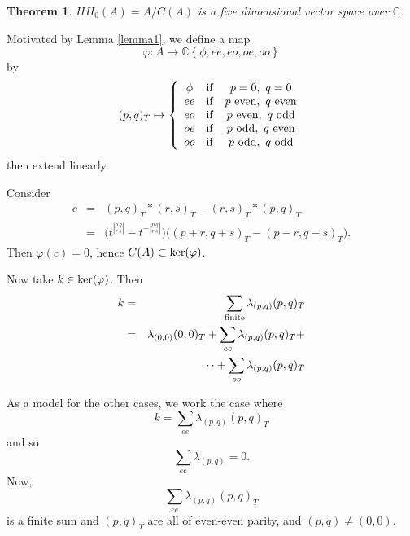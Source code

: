 \documentclass{slides}
\newtheorem{theorem}{Theorem}
\begin{document}
\begin{slide}
\begin{theorem}
$HH_0(A) = A/C(A)$ is a five dimensional
vector space over $\mathbb{C}$.
\label{five-dim}
\end{theorem}

\proof
Motivated by Lemma \ref{lemma1}, we define a map
$$\varphi \colon
A \to \mathbb{C} \left\{ \phi, ee, eo, oe, oo \right\}$$
by
$$(p,q)_T \mapsto \left\{
{\begin{array}{ccc}
\phi & {\rm if} & p=0,~q=0 \\
ee & {\rm if} & p~{\rm even},~q~{\rm even} \\
eo & {\rm if} & p~{\rm even},~q~{\rm odd} \\
oe & {\rm if} & p~{\rm odd},~q~{\rm even} \\
oo & {\rm if} & p~{\rm odd},~q~{\rm odd}
\end{array}}
\right.$$
then extend linearly.

Consider
\begin{eqnarray}
c & = & (p,q)_T * (r,s)_T - (r,s)_T * (p,q)_T \nonumber \\
& = & \Big( t^{|^{p~q}_{r~s}|} - t^{- |^{p~q}_{r~s}|} \Big)
\Big( (p+r, q+s)_T - (p-r, q-s)_T \Big). \nonumber
\end{eqnarray}
Then $\varphi(c) = 0$, hence $C(A) \subset {\rm ker}(\varphi)$.
\end{slide}

\begin{slide}

Now take $k \in {\rm ker}(\varphi)$.  Then
\begin{eqnarray}
k & = & \sum_{{\rm finite}} \lambda_{(p,q)} (p,q)_T \nonumber \\
& = & \lambda_{(0,0)} (0,0)_T + \sum_{ee} \lambda_{(p,q)}
(p,q)_T + \nonumber \\
& &  \dots + \sum_{oo} \lambda_{(p,q)} (p,q)_T \nonumber
\label{parity-sum}
\end{eqnarray}

As a model for the other cases, we work the case where
$$k = \sum_{ee} \lambda_{(p,q)} (p,q)_T$$ and so
$$\sum_{ee} \lambda_{(p,q)} = 0.$$
Now, $$\sum_{ee} \lambda_{(p,q)} (p,q)_T$$ is a finite sum
and $(p,q)_T$ are all of even-even parity, and $(p,q) \neq (0,0)$.
\end{slide}
\end{document}

